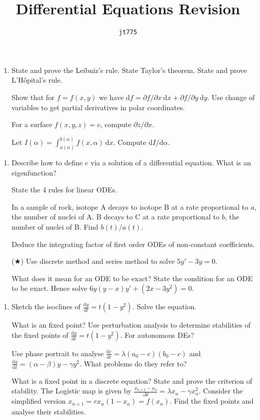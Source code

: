 \documentclass[11pt]{article}
\title{\textbf{Differential Equations Revision}}
\author{\texttt{jt775}}
\date{\null}
\newcommand{\rmd}{\mathrm{d}}
\newlength{\qspace}
\newcounter{qnumber}
\newenvironment{question}%
 {\vspace{\qspace}
  \begin{enumerate}[\bfseries 1\quad][10]%
    \setcounter{enumi}{\value{qnumber}}%
    \item%
 }
{
  \end{enumerate}
  \filbreak
  \stepcounter{qnumber}
 }
\begin{document}
\maketitle
\vspace{-1.5cm}
\begin{question}
    State and prove the Leibniz's rule. State Taylor's theorem. State and prove L'H\^{o}pital's rule.

    Show that for $ f=f(x,y) $ we have $ \rmd f=\partial f/\partial x\ \rmd x+\partial f/\partial y\ \rmd y  $. Use change of variables to get partial derivatives in polar coordinates.

    For a surface $ f(x,y,z)=c $, compute $ \partial z/\partial x  $.

    Let $ I(\alpha) = \int_{a(\alpha)}^{b(\alpha)} f(x,\alpha) \,\mathrm{d}x$. Compute $ \rmd I/ \rmd \alpha  $.
\end{question}
\begin{question}
  Describe how to define $e$ via a solution of a differential equation. What is an eigenfunction?

  State the 4 rules for linear ODEs.

  In a sample of rock, isotope A decays to isotope B at a rate proportional to $a$, the number of nuclei of A. B decays to C at a rate proportional to $b$, the number of nuclei of B. Find $b(t)/a(t)$.

  Deduce the integrating factor of first order ODEs of non-constant coefficients.

  ({\color{red}$\bigstar$}) Use discrete method and series method to solve $ 5y'-3y=0 $.

  What does it mean for an ODE to be exact? State the condition for an ODE to be exact. Hence solve $ 6y(y-x)y'+(2x-3y^2)=0 $.
\end{question}
\begin{question}
  Sketch the isoclines of $ \frac{\mathrm{d}y}{\mathrm{d}t}=t(1-y^2) $. Solve the equation.

  What is an fixed point? Use perturbation analysis to determine stabilities of the fixed points of $ \frac{\mathrm{d}y}{\mathrm{d}t}=t(1-y^2) $. For autonomous DEs?

  Use phase portrait to analyse $ \frac{\mathrm{d}c}{\mathrm{d}t}=\lambda(a_0-c)(b_0-c)  $ and $ \frac{\mathrm{d}y}{\mathrm{d}t} =(\alpha-\beta)y-\gamma y^2 $. What problems do they refer to?

  What is a fixed point in a discrete equation? State and prove the criterion of stability. The Logistic map is given by $ \frac{x_{n+1}-x_n}{\Delta t}=\lambda x_n-\gamma x_{n}^2 $. Consider the simplified version $ x_{n+1}=rx_n(1-x_n)=f(x_n) $. Find the fixed points and analyse their stabilities.
\end{question}
\end{document}
